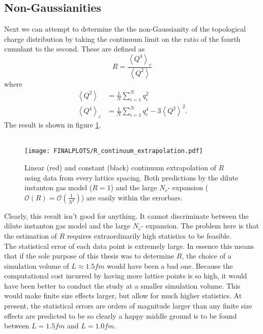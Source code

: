\documentclass[a4paper,10pt]{book}
\begin{document}
\subsection{Non-Gaussianities}
Next we can attempt to determine the the non-Gaussianity of the topological charge distribution by taking the continuum limit on the ratio of the fourth cumulant to the second. These are defined as  
\begin{equation}
R = \frac{\left\langle Q^4 \right\rangle_c}{\left\langle Q^2 \right\rangle}
\end{equation}
where
\begin{equation}
\begin{aligned}
\left\langle Q^2 \right\rangle &=\frac{1}{N} \sum_{i=1}^{N} q_{i}^{2} \\
\left\langle Q^4 \right\rangle_c &=\frac{1}{N} \sum_{i=1}^{N} q_{i}^{4}-3\left\langle Q^2 \right\rangle^{2}.
\end{aligned}
\end{equation}
The result is shown in figure \ref{fig:R-contLim}.\\\\
\begin{figure}[htbp]
\centering
\texttt{[image: FINALPLOTS/R\_continuum\_extrapolation.pdf]}
\caption[]{Linear (red) and constant (black) continuum extrapolation of $R$ using data from every lattice spacing. Both predictions by the dilute instanton gas model ($R=1$) and the large $N_c$- expansion ($\mathcal{O}(R) = \mathcal{O}(\frac{1}{N^2})$) are easily within the errorbars.}\label{fig:R-contLim}
\end{figure}
Clearly, this result isn't good for anything. It cannot discriminate between the dilute instanton gas model and the large $N_c$- expansion. The problem here is that the estimation of $R$ requires extraordinarily high statistics to be feasible.\\The statistical error of each data point is extremely large. In essence this means that if the sole purpose of this thesis was to determine $R$, the choice of a simulation volume of $L\approx 1.5fm$ would have been a bad one. Because the computational cost incurred by having more lattice points is so high, it would have been better to conduct the study at a smaller simulation volume. This would make finite size effects larger, but allow for much higher statistics. At present, the statistical errors are orders of magnitude larger than any finite size effects  are predicted to be \cite{non_gaussianities2015} so clearly a happy middle ground is to be found between $L = 1.5fm$ and $L =  1.0fm$. 
\FloatBarrier
\end{document}
